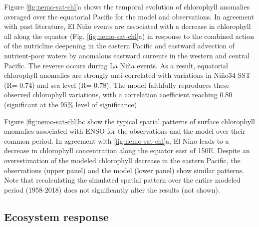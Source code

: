 Figure \ref{fig:nemo-sat-chl}a shows the temporal evolution of chlorophyll anomalies averaged over the equatorial Pacific for the model and observations. In agreement with past literature, El Niño events are associated with a decrease in chlorophyll all along the equator (Fig. \ref{fig:nemo-sat-chl}a) in response to the combined action of the nutricline deepening in the eastern Pacific and eastward advection of nutrient‐poor waters by anomalous eastward currents in the western and central Pacific. The reverse occurs during La Niña events. As a result, equatorial chlorophyll anomalies are strongly anti-correlated with variations in Niño34 SST (R=-0.74) and sea level (R=-0.78). The model faithfully reproduces these observed chlorophyll variations, with a correlation coefficient reaching $0.80$ (significant at the $95\%$ level of significance).

Figure \ref{fig:nemo-sat-chl}bc show the typical spatial patterns of surface chlorophyll anomalies associated with ENSO for the observations and the model over their common period. In agreement with \ref{fig:nemo-sat-chl}a, El Nino leads to a decrease in chlorophyll concentration along the equator east of 150\degree{}E. Despite an overestimation of the modeled chlorophyll decrease in the eastern Pacific, the observations (upper panel) and the model (lower panel) show similar patterns. Note that recalculating the simulated spatial pattern over the entire modeled period (1958-2018) does not significantly alter the results (not shown). 

\subsection{Ecosystem response}

